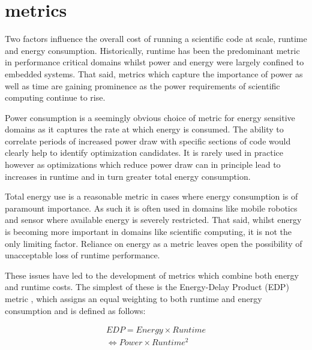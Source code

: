 \section{metrics }
\label{sec:metrics}

Two factors influence the overall cost of running a scientific code at scale, runtime and energy consumption.
Historically, runtime has been the predominant metric in performance critical domains whilst power and energy were largely confined to embedded systems.
That said, metrics which capture the importance of power as well as time are gaining prominence as the power requirements of scientific computing continue to rise.



Power consumption is a seemingly obvious choice of metric for energy sensitive domains as it captures the rate at which energy is consumed.
The ability to correlate periods of increased power draw with specific sections of code would clearly help to identify optimization candidates.
It is rarely used in practice however as optimizations which reduce power draw can in principle lead to increases in runtime and in turn greater total energy consumption.

Total energy use is a reasonable metric in cases where energy consumption is of paramount importance.
As such it is often used in domains like mobile robotics and sensor where available energy is severely restricted.
That said, whilst energy is becoming more important in domains like scientific computing, it is not the only limiting factor. 
Reliance on energy as a metric leaves open the possibility of unacceptable loss of runtime performance.

These issues have led to the development of metrics which combine both energy and runtime costs.
The simplest of these is the Energy-Delay Product (EDP) metric \cite{gonzales:1995aa}, which assigns an equal weighting to both runtime and energy consumption and is defined as follows:

\begin{align}
  EDP = Energy \times Runtime \nonumber \\
      \Leftrightarrow Power \times Runtime^{2} 
  \label{eq:edp}
\end{align}

